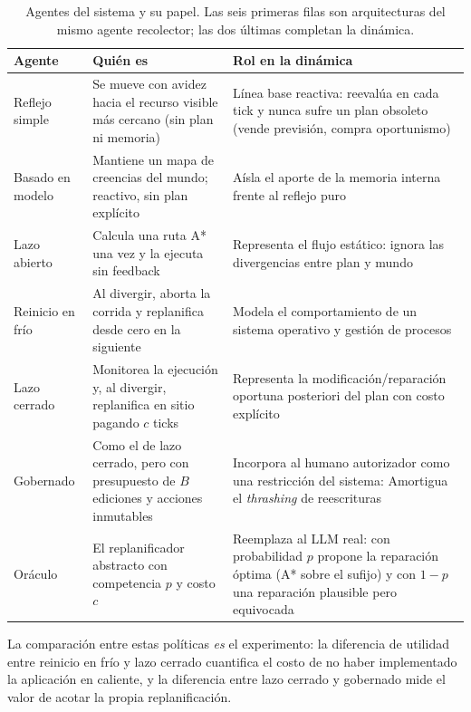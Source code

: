 \begin{table}[ht]
\centering
\small
\begin{tabular}{@{}l L{4.6cm} L{5.2cm}@{}}
\toprule
\textbf{Agente} & \textbf{Quién es} & \textbf{Rol en la dinámica} \\
\midrule
Reflejo simple & Se mueve con avidez hacia el recurso visible más cercano (sin plan ni memoria) & Línea base reactiva: reevalúa en cada tick y nunca sufre un plan obsoleto (vende previsión, compra oportunismo) \\
Basado en modelo & Mantiene un mapa de creencias del mundo; reactivo, sin plan explícito & Aísla el aporte de la memoria interna frente al reflejo puro \\
Lazo abierto & Calcula una ruta A* una vez y la ejecuta sin feedback & Representa el flujo estático: ignora las divergencias entre plan y mundo \\
Reinicio en frío & Al divergir, aborta la corrida y replanifica desde cero en la siguiente & Modela el comportamiento de un sistema operativo y gestión de procesos
\\
Lazo cerrado & Monitorea la ejecución y, al divergir, replanifica en sitio pagando $c$ ticks & Representa la modificación/reparación oportuna posteriori
del plan con costo explícito \\
Gobernado & Como el de lazo cerrado, pero con presupuesto de $B$ ediciones y
acciones inmutables
& Incorpora al humano autorizador como una restricción del sistema: Amortigua el \emph{thrashing} de reescrituras \\

\addlinespace
Oráculo & El replanificador abstracto con competencia $p$ y costo $c$ &
Reemplaza al LLM real: con probabilidad $p$ propone la reparación óptima (A* sobre el
sufijo) y con $1-p$ una reparación plausible pero equivocada \\
\bottomrule
\end{tabular}
\caption{Agentes del sistema y su papel. Las seis primeras filas son arquitecturas del
mismo agente recolector; las dos últimas completan la dinámica.}
\end{table}

La comparación entre estas políticas \emph{es} el experimento: la diferencia de
utilidad entre reinicio en frío y lazo cerrado cuantifica el costo de no haber
implementado la aplicación en caliente, y la diferencia entre lazo cerrado y gobernado
mide el valor de acotar la propia replanificación.

